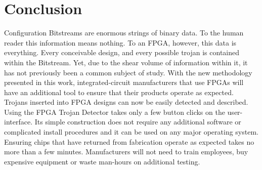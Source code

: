 \documentclass[journal, hidelinks]{IEEEtran}
\begin{document}
\section{Conclusion} \label{sec:conclusion}
Configuration Bitstreams are enormous strings of binary data.
To the human reader this information means nothing.
To an FPGA, however, this data is everything.
Every conceivable design, and every possible trojan is contained within the Bitstream.
Yet, due to the shear volume of information within it, it has not previously been a common subject of study.
With the new methodology presented in this work, integrated-circuit manufacturers that use FPGAs will have an additional tool to ensure that their products operate as expected.
Trojans inserted into FPGA designs can now be easily detected and described.
Using the FPGA Trojan Detector takes only a few button clicks on the user-interface.
Its simple construction does not require any additional software or complicated install procedures and it can be used on any major operating system.
Ensuring chips that have returned from fabrication operate as expected takes no more than a few minutes.
Manufacturers will not need to train employees, buy expensive equipment or waste man-hours on additional testing.
\end{document}
